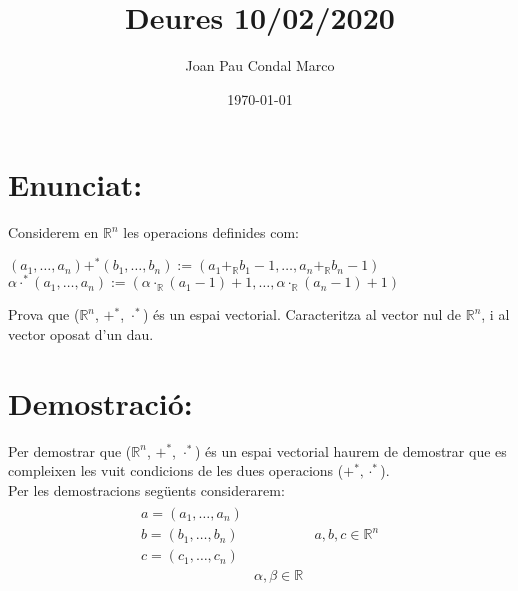 \documentclass[a4paper, 9pt]{article}
\title{Deures 10/02/2020}
\author{Joan Pau Condal Marco}
\date{\today}
\begin{document}
    \maketitle
    \justify
    \section*{Enunciat:}

    Considerem en ${\mathbb{R}^n}$ les operacions definides com:
    \begin{center}
        \begin{math}
            (a_1, \dots , a_n) +^* (b_1, \dots , b_n) := (a_1 +_{\mathbb{R}} b_1 - 1, \dots , a_n +_{\mathbb{R}} b_n -1) 
        \end{math}
        \begin{math}
            \alpha \cdot^* (a_1, \dots , a_n) := (\alpha \cdot_{\mathbb{R}} (a_1 -1)+1, \dots , \alpha \cdot_{\mathbb{R}} (a_n -1)+1)
        \end{math}
    \end{center}
    Prova que (${\mathbb{R}}^n$, ${+^*}$, ${\cdot^*}$) \'es un espai vectorial. Caracteritza al vector nul de ${\mathbb{R}^n}$, i al vector oposat d'un dau.  \\

    \section*{Demostraci\'o:}
    Per demostrar que (${\mathbb{R}}^n$, ${+^*}$, ${\cdot^*}$) \'es un espai vectorial haurem de demostrar que es compleixen les vuit condicions de les dues operacions (${+^*, \cdot^*}$).\\
    Per les demostracions següents considerarem:
    \begin{align*}
        \begin{array}{lcl}
            a = (a_1,\dots,a_n)& & \\
            b = (b_1,\dots,b_n)& & a, b, c \in \mathbb{R}^n\\
            c = (c_1,\dots,c_n)& &\\
            & \alpha,\beta \in \mathbb{R} &
        \end{array}
    \end{align*}
    
\end{document}

